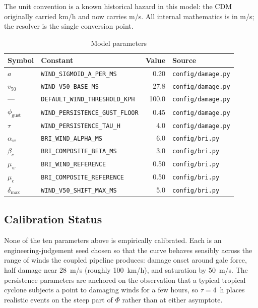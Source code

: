 \documentclass[11pt,a4paper]{article}
\begin{document}
The unit convention is a known historical hazard in this model: the CDM
originally carried km/h and now carries m/s. All internal mathematics is in m/s;
the resolver is the single conversion point.

\mkminputs

\begin{table}[H]
  \centering
  \caption{Model parameters}
  \begin{tabular}{llrl}
    \toprule
    \textbf{Symbol} & \textbf{Constant} & \textbf{Value} & \textbf{Source} \\
    \midrule
    $a$ & \texttt{WIND\_SIGMOID\_A\_PER\_MS} & 0.20 & \texttt{config/damage.py} \\
    $v_{50}$ & \texttt{WIND\_V50\_BASE\_MS} & 27.8 & \texttt{config/damage.py} \\
    --- & \texttt{DEFAULT\_WIND\_THRESHOLD\_KPH} & 100.0 & \texttt{config/damage.py} \\
    $\phi_{\text{gust}}$ & \texttt{WIND\_PERSISTENCE\_GUST\_FLOOR} & 0.45 & \texttt{config/damage.py} \\
    $\tau$ & \texttt{WIND\_PERSISTENCE\_TAU\_H} & 4.0 & \texttt{config/damage.py} \\
    $\alpha_w$ & \texttt{BRI\_WIND\_ALPHA\_MS} & 6.0 & \texttt{config/bri.py} \\
    $\beta_c$ & \texttt{BRI\_COMPOSITE\_BETA\_MS} & 3.0 & \texttt{config/bri.py} \\
    $\mu_w$ & \texttt{BRI\_WIND\_REFERENCE} & 0.50 & \texttt{config/bri.py} \\
    $\mu_c$ & \texttt{BRI\_COMPOSITE\_REFERENCE} & 0.50 & \texttt{config/bri.py} \\
    $\delta_{\max}$ & \texttt{WIND\_V50\_SHIFT\_MAX\_MS} & 5.0 & \texttt{config/bri.py} \\
    \bottomrule
  \end{tabular}
\end{table}

\subsection{Calibration Status}
None of the ten parameters above is empirically calibrated. Each is an
engineering-judgement seed chosen so that the curve behaves sensibly across the
range of winds the coupled pipeline produces: damage onset around gale force,
half damage near 28~m/s (roughly 100~km/h), and saturation by 50~m/s. The
persistence parameters are anchored on the observation that a typical tropical
cyclone subjects a point to damaging winds for a few hours, so $\tau = 4$~h
places realistic events on the steep part of $\Phi$ rather than at either
asymptote.
\end{document}
